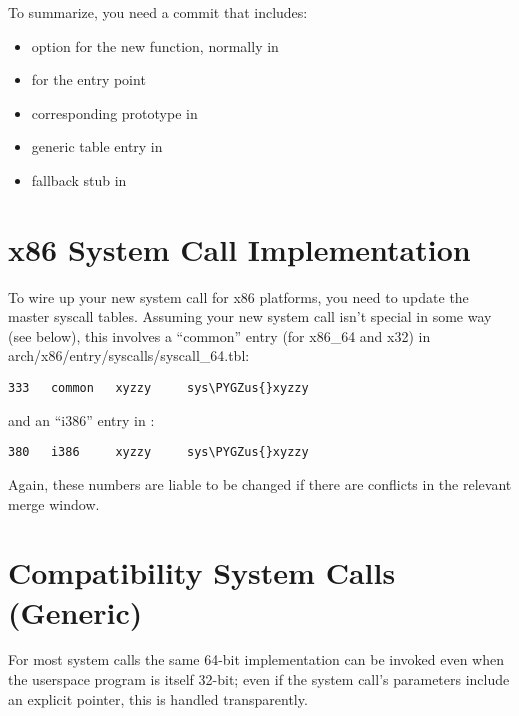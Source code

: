\documentclass[a4paper,8pt,english]{sphinxmanual}
\def\PYGZus{\char`\_}
\begin{document}
To summarize, you need a commit that includes:
\begin{itemize}
\item {} 
 option for the new function, normally in 

\item {} 
 for the entry point

\item {} 
corresponding prototype in 

\item {} 
generic table entry in 

\item {} 
fallback stub in 

\end{itemize}


\section{x86 System Call Implementation}
\label{process/adding-syscalls:x86-system-call-implementation}
To wire up your new system call for x86 platforms, you need to update the
master syscall tables.  Assuming your new system call isn't special in some
way (see below), this involves a ``common'' entry (for x86\_64 and x32) in
arch/x86/entry/syscalls/syscall\_64.tbl:

\begin{Verbatim}[commandchars=\\\{\}]
333   common   xyzzy     sys\PYGZus{}xyzzy
\end{Verbatim}

and an ``i386'' entry in :

\begin{Verbatim}[commandchars=\\\{\}]
380   i386     xyzzy     sys\PYGZus{}xyzzy
\end{Verbatim}

Again, these numbers are liable to be changed if there are conflicts in the
relevant merge window.


\section{Compatibility System Calls (Generic)}
\label{process/adding-syscalls:compatibility-system-calls-generic}
For most system calls the same 64-bit implementation can be invoked even when
the userspace program is itself 32-bit; even if the system call's parameters
include an explicit pointer, this is handled transparently.
\end{document}
